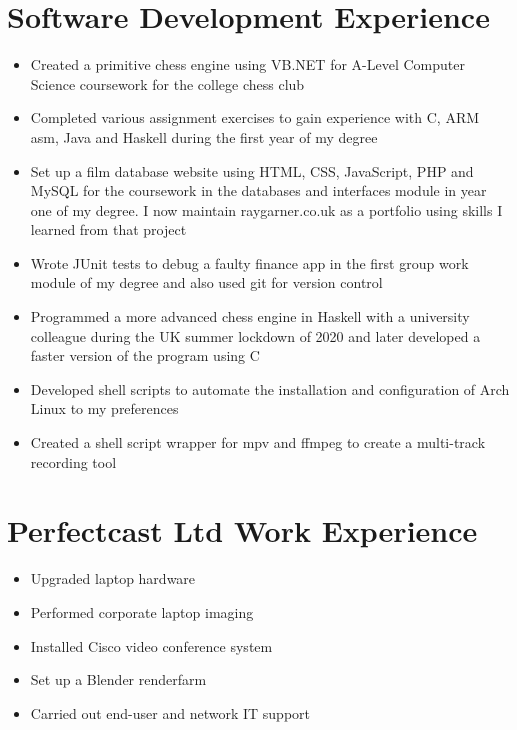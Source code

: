 \documentclass{article}
\begin{document}
\section{Software Development Experience}

\begin{itemize}[noitemsep]

\renewcommand{\labelitemi}{$\square$}
\item Created a primitive chess engine using VB.NET for A-Level Computer Science coursework for the college chess club
\item Completed various assignment exercises to gain experience with C, ARM asm, Java and Haskell during the first year of my degree
\item Set up a film database website using HTML, CSS, JavaScript, PHP and MySQL for the coursework in the databases and interfaces module in year one of my degree. I now maintain raygarner.co.uk as a portfolio using skills I learned from that project
\item Wrote JUnit tests to debug a faulty finance app in the first group work module of my degree and also used git for version control
\item Programmed a more advanced chess engine in Haskell with a university colleague during the UK summer lockdown of 2020 and later developed a faster version of the program using C
\item Developed shell scripts to automate the installation and configuration of Arch Linux to my preferences 
\item Created a shell script wrapper for mpv and ffmpeg to create a multi-track recording tool

\end{itemize}




\section{Perfectcast Ltd Work Experience}


\begin{itemize}[noitemsep]

\renewcommand{\labelitemi}{$\square$}
\item Upgraded laptop hardware
\item Performed corporate laptop imaging
\item Installed Cisco video conference system 
\item Set up a Blender renderfarm
\item Carried out end-user and network IT support

\end{itemize}
\end{document}
